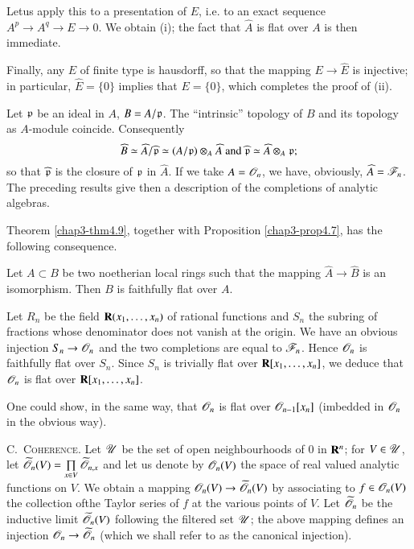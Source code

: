Let\pageoriginale us apply this to a presentation of $E$, i.e. to an exact sequence $A^{p}\to A^{q}\to E\to 0$. We obtain (i); the fact that $\widehat{A}$ is flat over $A$ is then immediate.

Finally, any $E$ of finite type is hausdorff, so that the mapping $E\to \widehat{E}$ is injective; in particular, $\widehat{E}=\{0\}$ implies that $E=\{0\}$, which completes the proof of (ii).

Let $\mathfrak{p}$ be an ideal in $A$, $B=A/\mathfrak{p}$. The ``intrinsic'' topology of $B$ and its topology as $A$-module coincide. Consequently 
$$
\widehat{B}\simeq \widehat{A}/\widehat{\mathfrak{p}}\simeq (A/\mathfrak{p})\otimes_{A}\widehat{A}\text{ and } \widehat{\mathfrak{p}}\simeq \widehat{A}\otimes_{A}\mathfrak{p};
$$
so that $\widehat{\mathfrak{p}}$ is the closure of $\mathfrak{p}$ in $\widehat{A}$. If we take $A=\mathscr{O}_{n}$, we have, obviously, $\widehat{A}=\mathscr{F}_{n}$. The preceding results give then a description of the completions of analytic algebras.

Theorem \ref{chap3-thm4.9}, together with Proposition \ref{chap3-prop4.7}, has the following consequence.

\begin{proposition}\label{chap3-prop4.10}
Let $A\subset B$ be two noetherian local rings such that the mapping $\widehat{A}\to \widehat{B}$ is an isomorphism. Then $B$ is faithfully flat over $A$.
\end{proposition}

\begin{example}\label{chap3-exam4.11}
Let $R_{n}$ be the field $\mathbf{R}(x_{1},\ldots,x_{n})$ of rational functions and $S_{n}$ the subring of fractions whose denominator does not vanish at the origin. We have an obvious injection $S_{n}\to \mathscr{O}_{n}$ and the two completions are equal to $\mathscr{F}_{n}$. Hence $\mathscr{O}_{n}$ is faithfully flat over $S_{n}$. Since $S_{n}$ is trivially flat over $\mathbf{R}[x_{1},\ldots,x_{n}]$, we deduce that $\mathscr{O}_{n}$ is flat over $\mathbf{R}[x_{1},\ldots,x_{n}]$.
\end{example}

One could show, in the same way, that $\mathscr{O}_{n}$ is flat over $\mathscr{O}_{n-1}[x_{n}]$ (imbedded in $\mathscr{O}_{n}$ in the obvious way).

C.~\textsc{Coherence.} Let $\mathscr{U}$ be the set of open neighbourhoods of $0$ in $\mathbf{R}^{n}$; for $V\in \mathscr{U}$, let $\widetilde{\mathscr{O}}_{n}(V)=\prod\limits_{x\in V}\widetilde{\mathscr{O}}_{n,x}$ and let us denote by $\mathscr{O}_{n}(V)$ the space of real valued analytic functions on $V$. We obtain a mapping $\mathscr{O}_{n}(V)\to \widetilde{\mathscr{O}}_{n}(V)$ by associating to $f\in \mathscr{O}_{n}(V)$ the collection of\pageoriginale the Taylor series of $f$ at the various points of $V$. Let $\widetilde{\mathscr{O}}_{n}$ be the inductive limit $\widetilde{\mathscr{O}}_{n}(V)$ following the filtered set $\mathscr{U}$; the above mapping defines an injection $\mathscr{O}_{n}\to \widetilde{\mathscr{O}}_{n}$ (which we shall refer to as the canonical injection).

